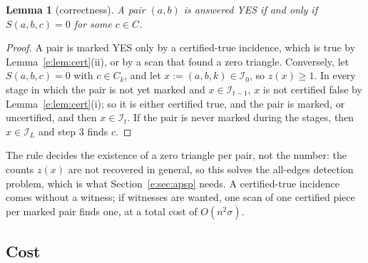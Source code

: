 \documentclass[11pt]{article}
\newtheorem{lemma}[theorem]{Lemma}
\theoremstyle{definition}
\theoremstyle{remark}
\newcommand{\Iq}{\mathcal{I}}
\begin{document}
\begin{lemma}[correctness]\label{e:lem:correctB}
A pair $(a,b)$ is answered YES if and only if $S(a,b,c)=0$ for some $c\in C$.
\end{lemma}
\begin{proof}
A pair is marked YES only by a certified-true incidence, which is true by Lemma~\ref{e:lem:cert}(ii), or by a scan that found a zero triangle. Conversely, let $S(a,b,c)=0$ with $c\in C_k$, and let $x:=(a,b,k)\in\Iq_0$, so $z(x)\ge1$. In every stage in which the pair is not yet marked and $x\in\Iq_{t-1}$, $x$ is not certified false by Lemma~\ref{e:lem:cert}(i); so it is either certified true, and the pair is marked, or uncertified, and then $x\in\Iq_t$. If the pair is never marked during the stages, then $x\in\Iq_L$ and step 3 finds $c$.
\end{proof}

The rule decides the existence of a zero triangle per pair, not the number: the counts $z(x)$ are not recovered in general, so this solves the all-edges detection problem, which is what Section~\ref{e:sec:apsp} needs. A certified-true incidence comes without a witness; if witnesses are wanted, one scan of one certified piece per marked pair finds one, at a total cost of $O(n^2\sigma)$.

\subsection{Cost}\label{e:sec:cost}
\end{document}
